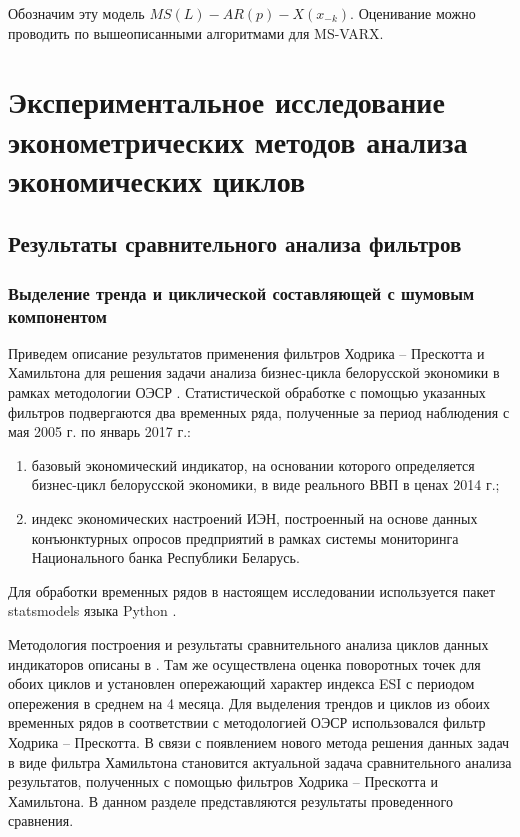 \documentclass[a4paper,14pt]{extreport}
\begin{document}
	Обозначим эту модель $MS(L)-AR(p)-X({x}_{-k})$. Оценивание можно проводить по вышеописанными алгоритмами для MS-VARX.
	
	
	\chapter{Экспериментальное исследование эконометрических методов анализа экономических циклов}
	
	\section{Результаты сравнительного анализа фильтров}
	
	\subsection{Выделение тренда и циклической составляющей с шумовым компонентом}
	
	Приведем описание результатов применения фильтров Ходрика -- Прескотта и Хамильтона для решения задачи анализа бизнес-цикла белорусской экономики в рамках методологии ОЭСР \cite{oecdCycleExtraction}. Статистической обработке с помощью указанных фильтров подвергаются два временных ряда, полученные за период наблюдения с мая 2005 г. по январь 2017 г.: 
	
	\begin{enumerate}
		\item базовый экономический индикатор, на основании которого определяется бизнес-цикл белорусской экономики, в виде реального ВВП в ценах 2014 г.;
		\item индекс экономических настроений ИЭН, построенный на основе данных конъюнктурных опросов предприятий в рамках системы мониторинга Национального банка Республики Беларусь.
	\end{enumerate}

	Для обработки временных рядов в настоящем исследовании используется пакет statsmodels языка Python \cite{statsmodels}.
	
	Методология построения и результаты сравнительного анализа циклов данных индикаторов описаны в \cite{esiMakingAlt}. Там же осуществлена оценка поворотных точек для обоих циклов и установлен опережающий характер индекса ESI с периодом опережения в среднем на 4 месяца. Для выделения трендов и циклов из обоих временных рядов в соответствии с методологией ОЭСР \cite{schuler_detrend} использовался фильтр Ходрика -- Прескотта. В связи с появлением нового метода решения данных задач в виде фильтра Хамильтона становится актуальной задача сравнительного анализа результатов, полученных с помощью фильтров Ходрика -- Прескотта и Хамильтона. В данном разделе представляются результаты проведенного сравнения. 
	
\end{document}
